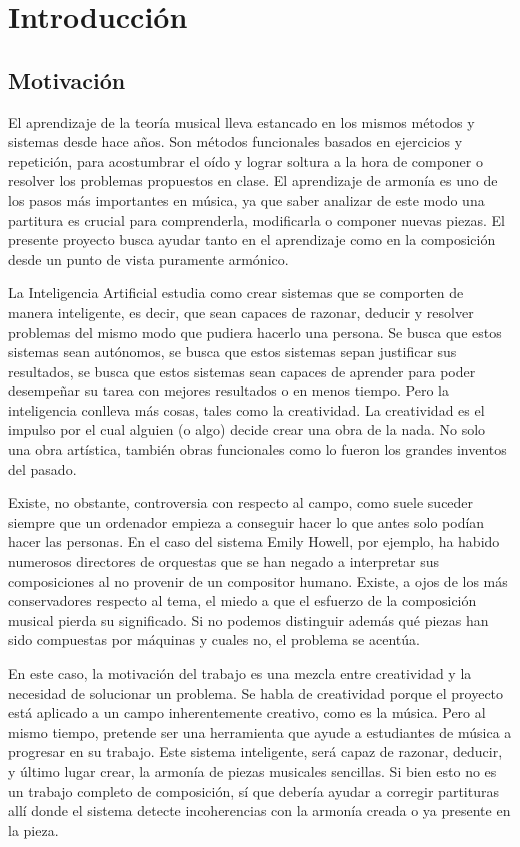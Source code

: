 \chapter{Introducción}
\minitoc
\label{chap:introduccion}

\section{Motivación}

El aprendizaje de la teoría musical lleva estancado en los mismos métodos y sistemas desde hace años. Son métodos funcionales basados en ejercicios y repetición, para acostumbrar el oído y lograr soltura a la hora de componer o resolver los problemas propuestos en clase. El aprendizaje de armonía es uno de los pasos más importantes en música, ya que saber analizar de este modo una partitura es crucial para comprenderla, modificarla o componer nuevas piezas. El presente proyecto busca ayudar tanto en el aprendizaje como en la composición desde un punto de vista puramente armónico. 

La Inteligencia Artificial estudia como crear sistemas que se comporten de manera inteligente, es decir, que sean capaces de razonar, deducir y resolver problemas del mismo modo que pudiera hacerlo una persona. Se busca que estos sistemas sean autónomos, se busca que estos sistemas sepan justificar sus resultados, se busca que estos sistemas sean capaces de aprender para poder desempeñar su tarea con mejores resultados o en menos tiempo. Pero la inteligencia conlleva más cosas, tales como la creatividad. La creatividad es el impulso por el cual alguien (o algo) decide crear una obra de la nada. No solo una obra artística, también obras funcionales como lo fueron los grandes inventos del pasado. 

Existe, no obstante, controversia con respecto al campo, como suele suceder siempre que un ordenador empieza a conseguir hacer lo que antes solo podían hacer las personas. En el caso del sistema Emily Howell, por ejemplo, ha habido numerosos directores de orquestas que se han negado a interpretar sus composiciones al no provenir de un compositor humano. Existe, a ojos de los más conservadores respecto al tema, el miedo a que el esfuerzo de la composición musical pierda su significado. Si no podemos distinguir además qué piezas han sido compuestas por máquinas y cuales no, el problema se acentúa. 

En este caso, la motivación del trabajo es una mezcla entre creatividad y la necesidad de solucionar un problema. Se habla de creatividad porque el proyecto está aplicado a un campo inherentemente creativo, como es la música. Pero al mismo tiempo, pretende ser una herramienta que ayude a estudiantes de música a progresar en su trabajo. Este sistema inteligente, será capaz de razonar, deducir, y último lugar crear, la armonía de piezas musicales sencillas. Si bien esto no es un trabajo completo de composición, sí que debería ayudar a corregir partituras allí donde el sistema detecte incoherencias con la armonía creada o ya presente en la pieza. 

